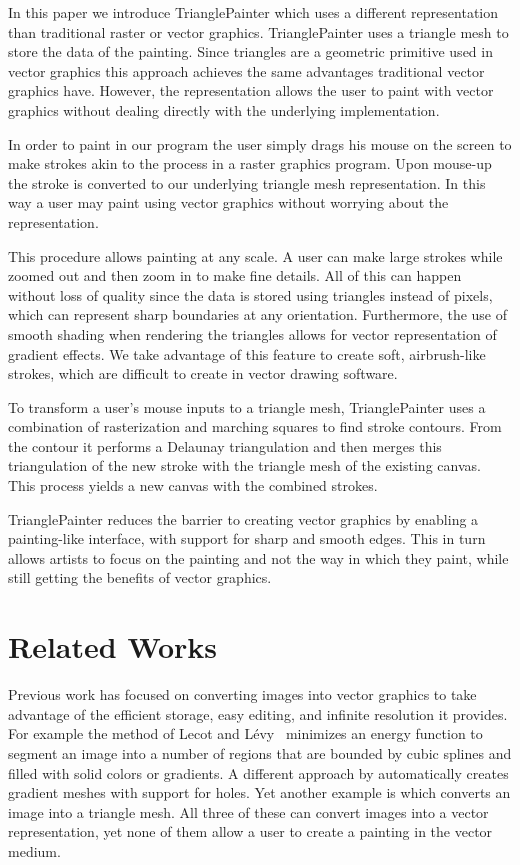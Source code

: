 \documentclass[review]{acmsiggraph}
\begin{document}
In this paper we introduce TrianglePainter which  
uses a different representation than traditional raster or vector graphics.
TrianglePainter uses a triangle mesh to store the data of the painting.
Since triangles are a geometric primitive used in vector graphics this approach achieves the
same advantages traditional vector graphics have. However, the representation allows the
user to paint with vector graphics without dealing directly with the underlying implementation.

In order to paint in our program the user simply drags his mouse on the screen to make
strokes akin to the process in a raster graphics program. Upon mouse-up the stroke is
converted to our underlying triangle mesh representation. In this way a user may paint using
vector graphics without worrying about the representation.

This procedure allows painting at any scale. A user can make large strokes
while zoomed out and then zoom in to make fine details. All of this can happen without
loss of quality since the data is stored using triangles instead of pixels, which can represent sharp boundaries at any orientation.  Furthermore, the use of smooth shading when rendering the triangles allows for vector representation of gradient effects.  We take advantage of this feature to create soft, airbrush-like strokes, which are difficult to create in vector drawing software.

To transform a user's mouse inputs to a triangle mesh,
TrianglePainter uses a combination of rasterization and marching squares to
find stroke contours. From the contour it performs a Delaunay triangulation
and then merges this triangulation
of the new stroke with the triangle mesh of the existing canvas. This process yields
a new canvas with the combined strokes.

TrianglePainter reduces the barrier to creating vector graphics by enabling a painting-like interface, with support for sharp and smooth edges. This in turn allows 
artists to focus on the painting and not the way in which they paint, while still 
getting the benefits of vector graphics.

\section{Related Works}

Previous work has focused on converting images into vector graphics to take advantage of the
efficient storage, easy editing, and infinite resolution it provides. For example the method of
Lecot and L\'{e}vy~
minimizes an energy function to segment an image into a number of regions that are bounded
by cubic splines and filled with solid colors or gradients. A different approach by \cite{Lai:2009:ATG:1531326.1531391} 
automatically creates gradient meshes with support for holes. Yet another example is \cite{10.1109/TVCG.2012.76} 
which converts an image into a triangle mesh. All three of these can convert images into
a vector representation, yet none of them allow a user to create a painting in the vector medium.
\end{document}
